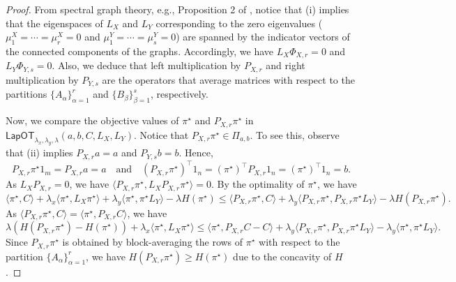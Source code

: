 \documentclass{article}
\theoremstyle{definition}
\begin{document}
\begin{proof}
    From spectral graph theory, e.g., Proposition 2 of \cite{von2007tutorial}, notice that (i) implies that the eigenspaces of $L_X$ and $L_Y$ corresponding to the zero eigenvalues ($\mu_1^X = \cdots = \mu_r^X = 0$ and $\mu_1^Y = \cdots = \mu_s^Y = 0$) are spanned by the indicator vectors of the connected components of the graphs. Accordingly, we have $L_X \Phi_{X, r} = 0$ and $L_Y \Phi_{Y, s} = 0$. Also, we deduce that left multiplication by $P_{X, r}$ and right multiplication by $P_{Y, s}$ are the operators that average matrices with respect to the partitions $\{A_\alpha\}_{\alpha = 1}^{r}$ and $\{B_\beta\}_{\beta = 1}^{s}$, respectively. 

    Now, we compare the objective values of $\pi^\star$ and $P_{X, r} \pi^\star$ in $\mathsf{LapOT}_{\lambda_x, \lambda_y, \lambda}(a, b, C, L_X, L_Y)$. Notice that $P_{X, r} \pi^\star \in \Pi_{a, b}$. To see this, observe that (ii) implies $P_{X, r} a = a$ and $P_{Y, s} b = b$. Hence,
    \begin{equation*}
        P_{X, r} \pi^\star 1_m = P_{X, r} a = a \quad \text{and} \quad (P_{X, r} \pi^\star)^\top 1_n = (\pi^\star)^\top P_{X, r} 1_n = (\pi^\star)^\top 1_n = b.
    \end{equation*}
    As $L_X P_{X, r} = 0$, we have $\langle P_{X, r} \pi^\star, L_X P_{X, r} \pi^\star \rangle = 0$. By the optimality of $\pi^\star$, we have
    \begin{equation*}
        \langle \pi^\star, C \rangle + \lambda_x \langle \pi^\star, L_X \pi^\star \rangle + \lambda_y \langle \pi^\star, \pi^\star L_Y \rangle - \lambda H(\pi^\star) \le \langle P_{X, r} \pi^\star, C \rangle + \lambda_y \langle P_{X, r} \pi^\star, P_{X, r} \pi^\star L_Y \rangle - \lambda H(P_{X, r} \pi^\star).
    \end{equation*}
    As $\langle P_{X, r} \pi^\star, C \rangle = \langle \pi^\star, P_{X, r} C \rangle$, we have
    \begin{equation*}
        \lambda (H(P_{X, r} \pi^\star) - H(\pi^\star)) + \lambda_x \langle \pi^\star, L_X \pi^\star \rangle
        \le
        \langle \pi^\star, P_{X, r} C - C \rangle + \lambda_y \langle P_{X, r} \pi^\star, P_{X, r} \pi^\star L_Y \rangle - \lambda_y \langle \pi^\star, \pi^\star L_Y \rangle.
    \end{equation*}
    Since $P_{X, r} \pi^\star$ is obtained by block-averaging the rows of $\pi^\star$ with respect to the partition $\{A_\alpha\}_{\alpha = 1}^{r}$, we have $H(P_{X, r} \pi^\star) \ge H(\pi^\star)$ due to the concavity of $H$. 

\end{proof}
\end{document}
